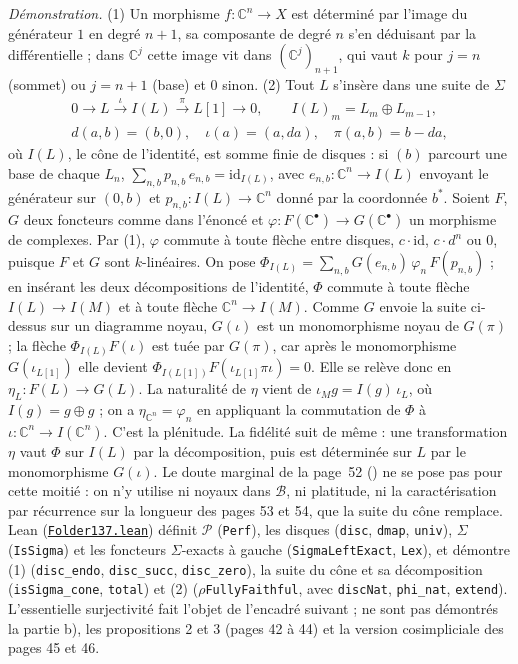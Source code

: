 {\small \emph{Démonstration.} (1) Un morphisme $f : \mathbb C^n \to X$ est déterminé par l'image du générateur $1$ en degré $n+1$, sa composante de degré $n$ s'en déduisant par la différentielle ; dans $\mathbb C^j$ cette image vit dans $(\mathbb C^j)_{n+1}$, qui vaut $k$ pour $j = n$ (sommet) ou $j = n+1$ (base) et $0$ sinon. (2) Tout $L$ s'insère dans une suite de $\Sigma$
\[
\begin{gathered}
0 \to L \xrightarrow{\iota} I(L) \xrightarrow{\pi} L[1] \to 0, \qquad I(L)_m = L_m \oplus L_{m-1},\\
d(a, b) = (b, 0),\quad \iota(a) = (a, da),\quad \pi(a, b) = b - da,
\end{gathered}
\]
où $I(L)$, le cône de l'identité, est somme finie de disques : si $(b)$ parcourt une base de chaque $L_n$, $\sum_{n, b} p_{n,b}\, e_{n,b} = \mathrm{id}_{I(L)}$, avec $e_{n,b} : \mathbb C^n \to I(L)$ envoyant le générateur sur $(0, b)$ et $p_{n,b} : I(L) \to \mathbb C^n$ donné par la coordonnée $b^*$. Soient $F$, $G$ deux foncteurs comme dans l'énoncé et $\varphi : F(\mathbb C^\bullet) \to G(\mathbb C^\bullet)$ un morphisme de complexes. Par (1), $\varphi$ commute à toute flèche entre disques, $c\cdot\mathrm{id}$, $c \cdot d^n$ ou $0$, puisque $F$ et $G$ sont $k$-linéaires. On pose $\Phi_{I(L)} = \sum_{n,b} G(e_{n,b})\,\varphi_n\,F(p_{n,b})$ ; en insérant les deux décompositions de l'identité, $\Phi$ commute à toute flèche $I(L) \to I(M)$ et à toute flèche $\mathbb C^n \to I(M)$. Comme $G$ envoie la suite ci-dessus sur un diagramme noyau, $G(\iota)$ est un monomorphisme noyau de $G(\pi)$ ; la flèche $\Phi_{I(L)} F(\iota)$ est tuée par $G(\pi)$, car après le monomorphisme $G(\iota_{L[1]})$ elle devient $\Phi_{I(L[1])} F(\iota_{L[1]} \pi \iota) = 0$. Elle se relève donc en $\eta_L : F(L) \to G(L)$. La naturalité de $\eta$ vient de $\iota_M g = I(g)\,\iota_L$, où $I(g) = g \oplus g$ ; on a $\eta_{\mathbb C^n} = \varphi_n$ en appliquant la commutation de $\Phi$ à $\iota : \mathbb C^n \to I(\mathbb C^n)$. C'est la plénitude. La fidélité suit de même : une transformation $\eta$ vaut $\Phi$ sur $I(L)$ par la décomposition, puis est déterminée sur $L$ par le monomorphisme $G(\iota)$. Le doute marginal de la page~52 () ne se pose pas pour cette moitié : on n'y utilise ni noyaux dans $\mathcal B$, ni platitude, ni la caractérisation par récurrence sur la longueur des pages 53 et 54, que la suite du cône remplace. Lean (\href{\leanblob/CategoryTheory/Folder137.lean}{\texttt{Folder137.\allowbreak{}lean}}) définit $\mathcal P$ (\texttt{Perf}), les disques (\texttt{disc}, \texttt{dmap}, \texttt{univ}), $\Sigma$ (\texttt{IsSigma}) et les foncteurs $\Sigma$-exacts à gauche (\texttt{SigmaLeftExact}, \texttt{Lex}), et démontre (1) (\texttt{disc\_endo}, \texttt{disc\_succ}, \texttt{disc\_zero}), la suite du cône et sa décomposition (\texttt{isSigma\_cone}, \texttt{total}) et (2) (\texttt{\(\rho\)FullyFaithful}, avec \texttt{discNat}, \texttt{phi\_nat}, \texttt{extend}). L'essentielle surjectivité fait l'objet de l'encadré suivant ; ne sont pas démontrés la partie b), les propositions 2 et 3 (pages 42 à 44) et la version cosimpliciale des pages 45 et 46.\par}

